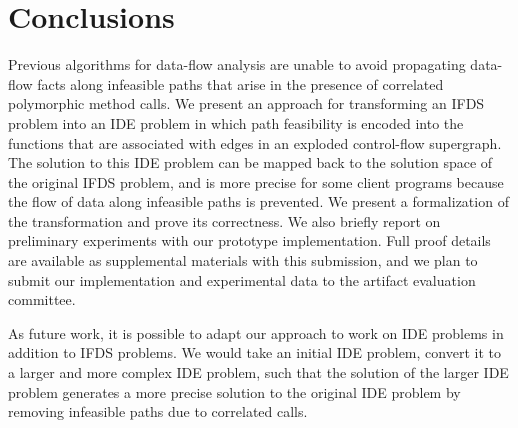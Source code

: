 \section{Conclusions}
  \label{sec:Conclusions}
  
Previous algorithms for data-flow analysis are unable to avoid propagating
data-flow facts along infeasible paths that arise in the presence of
correlated polymorphic method calls. 
% 
We present an approach for transforming an IFDS problem into an IDE problem
in which path feasibility is encoded into the functions that are associated
with edges in an exploded control-flow supergraph. The solution to this
IDE problem can be mapped back to the solution space of the original IFDS
problem, and is more precise for some client programs because the flow of data along
infeasible paths is prevented. We present a formalization of the
transformation and prove its correctness. We also briefly report on
preliminary experiments with our prototype implementation. Full proof
details are available as supplemental materials with this submission,
and we plan to submit our implementation and experimental data to the
artifact evaluation committee. 
  
As future work, it is possible to adapt our approach to work on IDE
problems in addition to IFDS problems. We would take an initial IDE
problem, convert it to a larger and more complex IDE problem, such
that the solution of the larger IDE problem generates a more precise
solution to the original IDE problem by removing infeasible paths due to
correlated calls.
